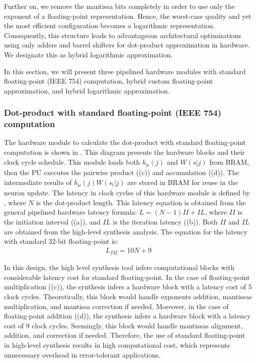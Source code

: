 Further on, we remove the mantissa bits completely in order to use only the exponent of a floating-point representation. Hence, the worst-case quality and yet the most efficient configuration becomes a logarithmic representation. Consequently, this structure leads to advantageous architectural optimizations using only adders and barrel shifters for dot-product approximation in hardware. We designate this as hybrid logarithmic approximation.

In this section, we will present three pipelined hardware modules with standard floating-point (IEEE 754) computation, hybrid custom floating-point approximation, and hybrid logarithmic approximation.

\subsubsection{Dot-product with standard floating-point (IEEE 754) computation}
 The hardware module to calculate the dot-product with standard floating-point computation is shown in . This diagram presents the hardware blocks and their clock cycle schedule. This module loads both $h_\mu(j)$ and $W(s|j)$ from BRAM, then the PU executes the pairwise product ((c)) and accumulation ((d)). The intermediate results of $h_\mu(j) W(s_t|j)$ are stored in BRAM for reuse in the neuron update. The latency in clock cycles of this hardware module is defined by , where $N$ is the dot-product length. This latency equation is obtained from the general pipelined hardware latency formula: $L=\left(N-1\right)II+IL$, where $II$ is the initiation interval ((a)), and $IL$ is the iteration latency ((b)). Both $II$ and $IL$ are obtained from the high-level synthesis analysis. The equation for the latency with standard 32-bit floating-point is:
 \begin{eqnarray} \label{eq:dot_standard_float_latency}
 L_{f32}=10N+9
 \end{eqnarray}
 
In this design, the high level synthesis tool infers computational blocks with considerable latency cost for standard floating-point. In the case of floating-point multiplication ((c)), the synthesis infers a hardware block with a latency cost of 5 clock cycles. Theoretically, this block would handle exponents addition, mantissas multiplication, and mantissa correction if needed. Moreover, in the case of floating-point addition ((d)), the synthesis infers a hardware block with a latency cost of 9 clock cycles. Seemingly, this block would handle mantissas alignment, addition, and correction if needed. Therefore, the use of standard floating-point in high-level synthesis results in high computational cost, which represents unnecessary overhead in error-tolerant applications.


